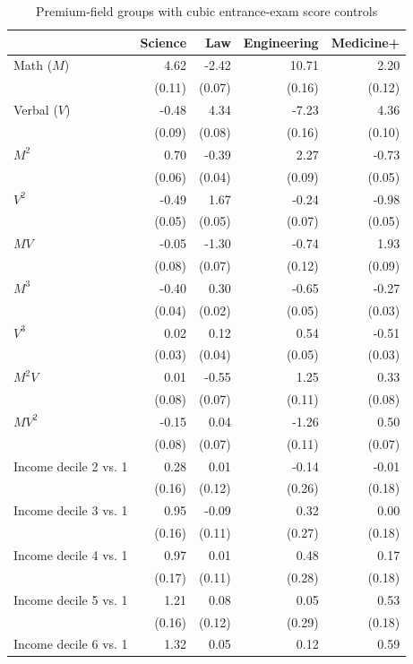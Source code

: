 \begin{table}[!htbp]\centering
\caption{Premium-field groups with cubic entrance-exam score controls}
\label{tab:premium-field-groups-cubic-scores-income}
\small
\begin{tabular}{lrrrr}\hline\hline
 & Science & Law & Engineering & Medicine+ \\ \hline
Math ($M$) & 4.62 & -2.42 & 10.71 & 2.20 \\
 & (0.11) & (0.07) & (0.16) & (0.12) \\
Verbal ($V$) & -0.48 & 4.34 & -7.23 & 4.36 \\
 & (0.09) & (0.08) & (0.16) & (0.10) \\
$M^2$ & 0.70 & -0.39 & 2.27 & -0.73 \\
 & (0.06) & (0.04) & (0.09) & (0.05) \\
$V^2$ & -0.49 & 1.67 & -0.24 & -0.98 \\
 & (0.05) & (0.05) & (0.07) & (0.05) \\
$M V$ & -0.05 & -1.30 & -0.74 & 1.93 \\
 & (0.08) & (0.07) & (0.12) & (0.09) \\
$M^3$ & -0.40 & 0.30 & -0.65 & -0.27 \\
 & (0.04) & (0.02) & (0.05) & (0.03) \\
$V^3$ & 0.02 & 0.12 & 0.54 & -0.51 \\
 & (0.03) & (0.04) & (0.05) & (0.03) \\
$M^2 V$ & 0.01 & -0.55 & 1.25 & 0.33 \\
 & (0.08) & (0.07) & (0.11) & (0.08) \\
$M V^2$ & -0.15 & 0.04 & -1.26 & 0.50 \\
 & (0.08) & (0.07) & (0.11) & (0.07) \\
Income decile 2 vs. 1 & 0.28 & 0.01 & -0.14 & -0.01 \\
 & (0.16) & (0.12) & (0.26) & (0.18) \\
Income decile 3 vs. 1 & 0.95 & -0.09 & 0.32 & 0.00 \\
 & (0.16) & (0.11) & (0.27) & (0.18) \\
Income decile 4 vs. 1 & 0.97 & 0.01 & 0.48 & 0.17 \\
 & (0.17) & (0.11) & (0.28) & (0.18) \\
Income decile 5 vs. 1 & 1.21 & 0.08 & 0.05 & 0.53 \\
 & (0.16) & (0.12) & (0.29) & (0.18) \\
Income decile 6 vs. 1 & 1.32 & 0.05 & 0.12 & 0.59 \\

\end{tabular}
\end{table}
